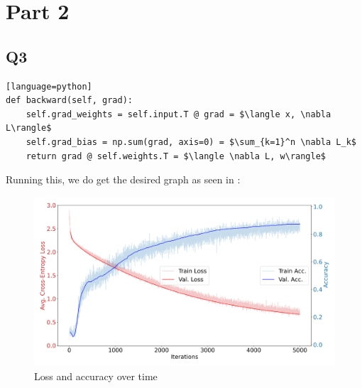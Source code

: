 \documentclass{article}
\theoremstyle{definition}
\begin{document}
\section*{Part 2}
    \subsection*{Q3}
\begin{lstlisting}[mathescape=true][language=python]
def backward(self, grad):
    self.grad_weights = self.input.T @ grad = $\langle x, \nabla L\rangle$
    self.grad_bias = np.sum(grad, axis=0) = $\sum_{k=1}^n \nabla L_k$
    return grad @ self.weights.T = $\langle \nabla L, w\rangle$
\end{lstlisting}
Running this, we do get the desired graph as seen in :
\begin{figure}[h]
    \centering
    \includegraphics[width=.5\textwidth]{figures/1.png}
    \caption{Loss and accuracy over time}
\end{figure}
\end{document}
